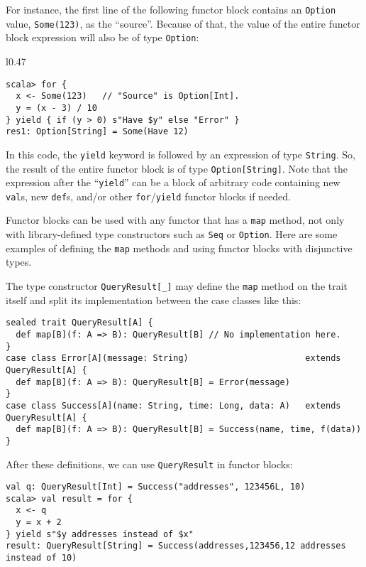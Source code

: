 For instance, the first line of the following functor block contains
an \lstinline!Option! value, \lstinline!Some(123)!, as the \textsf{``}source\textsf{''}.
Because of that, the value of the entire functor block expression
will also be of type \lstinline!Option!:

\begin{wrapfigure}{l}{0.47\columnwidth}%
\vspace{-0.85\baselineskip}
\begin{lstlisting}
scala> for {
  x <- Some(123)   // "Source" is Option[Int].
  y = (x - 3) / 10
} yield { if (y > 0) s"Have $y" else "Error" }
res1: Option[String] = Some(Have 12)
\end{lstlisting}

\vspace{-1.2\baselineskip}
\end{wrapfigure}%

\noindent In this code, the \lstinline!yield! keyword is followed
by an expression of type \lstinline!String!. So, the result of the
entire functor block is of type \lstinline!Option[String]!. Note
that the expression after the \textsf{``}\lstinline!yield!\textsf{''} can be a block
of arbitrary code containing new \lstinline!val!s, new \lstinline!def!s,
and/or other \lstinline!for!/\lstinline!yield! functor blocks if
needed.

Functor blocks can be used with any functor that has a \lstinline!map!
method, not only with library-defined type constructors such as \lstinline!Seq!
or \lstinline!Option!. Here are some examples of defining the \lstinline!map!
methods and using functor blocks with disjunctive types.

The type constructor \lstinline!QueryResult[_]! may define the \lstinline!map!
method on the trait itself and split its implementation between the
case classes like this:
\begin{lstlisting}
sealed trait QueryResult[A] {
  def map[B](f: A => B): QueryResult[B] // No implementation here.
}
case class Error[A](message: String)                       extends QueryResult[A] {
  def map[B](f: A => B): QueryResult[B] = Error(message)
}
case class Success[A](name: String, time: Long, data: A)   extends QueryResult[A] {
  def map[B](f: A => B): QueryResult[B] = Success(name, time, f(data))
}
\end{lstlisting}
After these definitions, we can use \lstinline!QueryResult! in functor
blocks:
\begin{lstlisting}
val q: QueryResult[Int] = Success("addresses", 123456L, 10)
scala> val result = for {
  x <- q
  y = x + 2
} yield s"$y addresses instead of $x"
result: QueryResult[String] = Success(addresses,123456,12 addresses instead of 10)
\end{lstlisting}

